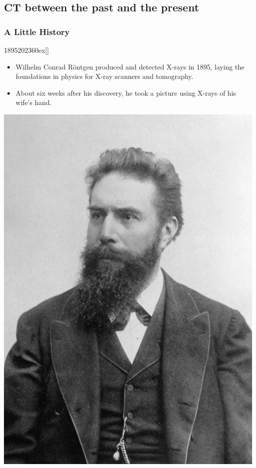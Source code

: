 \documentclass{beamer}
\begin{document}
\subsection{CT between the past and the present}
\begin{frame}
	\frametitle{A Little History}
	\begin{chronology}[20]{1895}{2023}{60ex}[\textwidth]

\end{chronology}
	\vspace{0.2cm}
	\begin{itemize}
		\item Wilhelm Conrad Röntgen produced and detected X-rays in 1895, laying the foundations in physics for X-ray scanners and tomography.
		 \pause
		\item About six weeks after his discovery, he took a picture using X-rays of his wife's hand.	
	\end{itemize}
	\center
		\includegraphics[scale=0.25]{media/Roentgen.jpg}
\end{frame}
\end{document}
